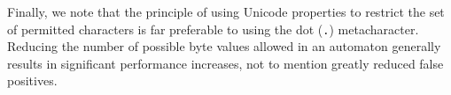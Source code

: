 \documentclass[5p,final,number,sort&compress]{elsarticle}
\newcommand{\re}[1]{\texttt{#1}}
\begin{document}
Finally, we note that the principle of using Unicode properties to restrict the set of permitted characters is far preferable to using the dot (\re{.}) metacharacter. Reducing the number of possible byte values allowed in an automaton generally results in significant performance increases, not to mention greatly reduced false positives.



\end{document}
